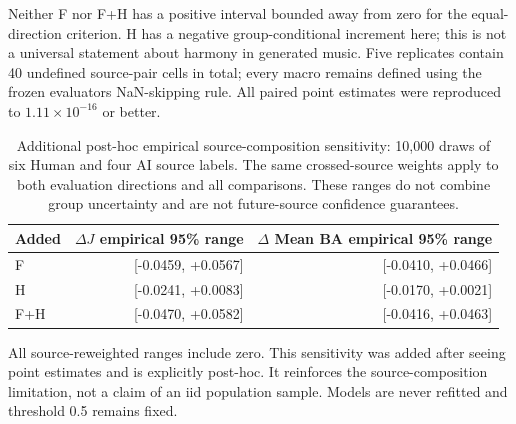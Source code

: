 Neither F nor F+H has a positive interval bounded away from zero for the equal-direction criterion. H has a negative group-conditional increment here; this is not a universal statement about harmony in generated music. Five replicates contain 40 undefined source-pair cells in total; every macro remains defined using the frozen evaluator\textquotesingle s NaN-skipping rule. All paired point estimates were reproduced to $1.11\times10^{-16}$ or better.

\begin{table}[htbp]
\centering\small
\caption{Additional post-hoc empirical source-composition sensitivity: 10,000 draws of six Human and four AI source labels. The same crossed-source weights apply to both evaluation directions and all comparisons. These ranges do not combine group uncertainty and are not future-source confidence guarantees.}
\label{tab:fh30-source-sensitivity}
\begin{tabular}{lrr}
\toprule Added & $\Delta J$ empirical 95\% range & $\Delta$ Mean BA empirical 95\% range \\
\midrule
F & [-0.0459, +0.0567] & [-0.0410, +0.0466] \\
H & [-0.0241, +0.0083] & [-0.0170, +0.0021] \\
F+H & [-0.0470, +0.0582] & [-0.0416, +0.0463] \\
\bottomrule
\end{tabular}
\end{table}

All source-reweighted ranges include zero. This sensitivity was added after seeing point estimates and is explicitly post-hoc. It reinforces the source-composition limitation, not a claim of an iid population sample. Models are never refitted and threshold 0.5 remains fixed.


